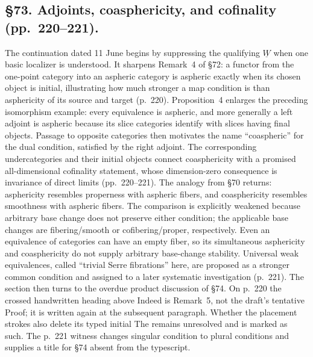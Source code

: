 \documentclass[10pt,oneside]{book}
\begin{document}
\subsection*{\S73. Adjoints, coasphericity, and cofinality (pp.\ 220--221).}
The continuation dated 11 June begins by suppressing the qualifying $\underline W$ when one basic localizer is understood. It sharpens Remark~4 of \S72: a functor from the one-point category into an aspheric category is aspheric exactly when its chosen object is initial, illustrating how much stronger a map condition is than asphericity of its source and target (p.\ 220). Proposition~4 enlarges the preceding isomorphism example: every equivalence is aspheric, and more generally a left adjoint is aspheric because its slice categories identify with slices having final objects. Passage to opposite categories then motivates the name ``coaspheric'' for the dual condition, satisfied by the right adjoint. The corresponding undercategories and their initial objects connect coasphericity with a promised all-dimensional cofinality statement, whose dimension-zero consequence is invariance of direct limits (pp.\ 220--221). The analogy from \S70 returns: asphericity resembles properness with aspheric fibers, and coasphericity resembles smoothness with aspheric fibers. The comparison is explicitly weakened because arbitrary base change does not preserve either condition; the applicable base changes are fibering/smooth or cofibering/proper, respectively. Even an equivalence of categories can have an empty fiber, so its simultaneous asphericity and coasphericity do not supply arbitrary base-change stability. Universal weak equivalences, called ``trivial Serre fibrations'' here, are proposed as a stronger common condition and assigned to a later systematic investigation (p.\ 221). The section then turns to the overdue product discussion of \S74. On p.\ 220 the crossed handwritten heading above Indeed is Remark~5, not the draft's tentative Proof; it is written again at the subsequent paragraph. Whether the placement strokes also delete its typed initial The remains unresolved and is marked as such. The p.\ 221 witness changes singular condition to plural conditions and supplies a title for \S74 absent from the typescript.
\end{document}
